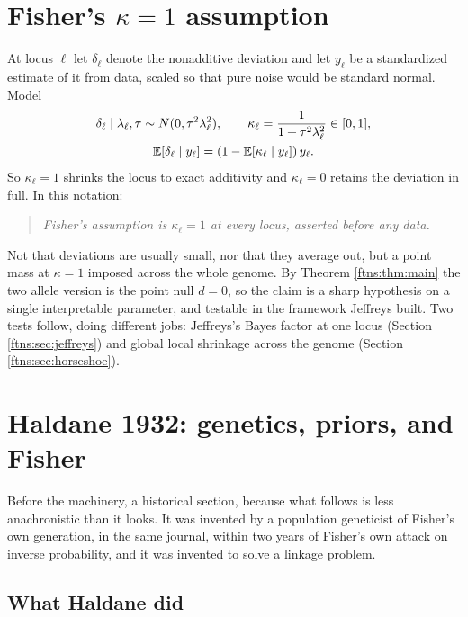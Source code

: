 \section{Fisher's $\kappa=1$ assumption}
\label{ftns:sec:kappa}

At locus $\ell$ let $\delta_\ell$ denote the nonadditive deviation and let $y_\ell$ be a
standardized estimate of it from data, scaled so that pure noise would be standard normal. Model
\begin{equation}
\begin{gathered}
\delta_\ell \mid \lambda_\ell,\tau \sim N(0,\tau^2\lambda_\ell^2),
\qquad
\kappa_\ell = \frac{1}{1+\tau^2\lambda_\ell^2} \in [0,1],
\\
\mathbb{E}[\delta_\ell\mid y_\ell]=(1-\mathbb{E}[\kappa_\ell\mid y_\ell])\,y_\ell .
\end{gathered}
\label{ftns:eq:kappa}
\end{equation}
So $\kappa_\ell=1$ shrinks the locus to exact additivity and $\kappa_\ell=0$ retains the deviation
in full. In this notation:

\begin{quote}
\emph{Fisher's assumption is $\kappa_\ell=1$ at every locus, asserted before any data.}
\end{quote}

Not that deviations are usually small, nor that they average out, but a point mass at $\kappa=1$
imposed across the whole genome. By Theorem \ref{ftns:thm:main} the two allele version is the point null
$d=0$, so the claim is a sharp hypothesis on a single interpretable parameter, and testable in the
framework Jeffreys built. Two tests follow, doing different jobs: Jeffreys's Bayes factor at one
locus (Section \ref{ftns:sec:jeffreys}) and global local shrinkage across the genome
(Section \ref{ftns:sec:horseshoe}).

\section{Haldane 1932: genetics, priors, and Fisher}
\label{ftns:sec:haldane}

Before the machinery, a historical section, because what follows is less anachronistic than it
looks. It was invented by a population geneticist of Fisher's own generation, in the same journal,
within two years of Fisher's own attack on inverse probability, and it was invented to solve a
linkage problem.

\subsection{What Haldane did}

